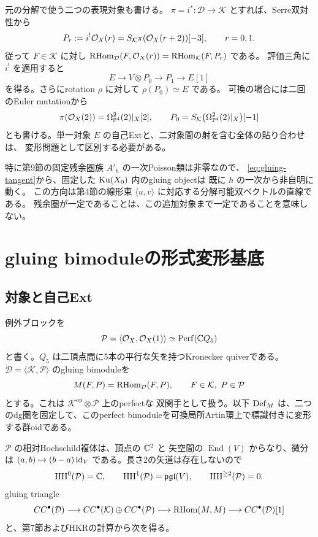 元の分解で使う二つの表現対象も書ける。
$\pi=i^*:\mathcal D\to\mathcal K$ とすれば、Serre双対性から
\[
 P_r:=i^!\mathcal O_X(r)=S_{\mathcal K}\pi(\mathcal O_X(r+2))[-3],
 \qquad r=0,1.
\]
従って $F\in\mathcal K$ に対し
$\operatorname{RHom}_{\mathcal D}(F,\mathcal O_X(r))=\operatorname{RHom}_{\mathcal K}(F,P_r)$ である。
評価三角に $i^!$ を適用すると
\[
 E\longrightarrow V\otimes P_0\longrightarrow P_1\longrightarrow E[1]
\]
を得る。さらにrotation $\rho$ に対して
$\rho(P_0)\simeq E$ である\cite[Remark 7.2]{FLZ}。
可換の場合には二回のEuler mutationから
\[
 \pi(\mathcal O_X(2))=\Omega^2_{\mathbb P^4}(2)|_X[2],\qquad
 P_0=S_{\mathcal K}\bigl(\Omega^2_{\mathbb P^4}(2)|_X\bigr)[-1]
\]
とも書ける。単一対象 $E$ の自己Extと、二対象間の射を含む全体の貼り合わせは、
変形問題として区別する必要がある。

特に第9節の固定残余圏族 $A'_h$ の一次Poisson類は非零なので、
\eqref{eq:gluing-tangent}から、固定した $\operatorname{Ku}(X_0)$ 内のgluing objectは
既に $h$ の一次から非自明に動く。
この方向は第4節の線形束 $\langle u,v\rangle$ に対応する分解可能双ベクトルの直線である。
残余圏が一定であることは、この追加対象まで一定であることを意味しない。

\section{gluing bimoduleの形式変形基底}\label{sec:gluing-moduli}

\subsection{対象と自己Ext}

例外ブロックを
\[
 \mathcal P=\langle\mathcal O_X,\mathcal O_X(1)\rangle
 \simeq\operatorname{Perf}(\mathbb C Q_5)
\]
と書く。$Q_5$ は二頂点間に5本の平行な矢を持つKronecker quiverである。
$\mathcal D=\langle\mathcal K,\mathcal P\rangle$ のgluing bimoduleを
\[
 M(F,P)=\operatorname{RHom}_{\mathcal D}(F,P),\qquad
 F\in\mathcal K,\ P\in\mathcal P
\]
とする。これは $\mathcal K^{\mathrm{op}}\otimes\mathcal P$ 上のperfectな
双関手として扱う。以下 $\operatorname{Def}_M$ は、二つのdg圏を固定して、このperfect
bimoduleを可換局所Artin環上で標識付きに変形する群oidである。

$\mathcal P$ の相対Hochschild複体は、頂点の $\mathbb C^2$ と
矢空間の $\operatorname{End}(V)$ からなり、微分は
$(a,b)\mapsto(b-a)\operatorname{id}_V$ である。長さ2の矢道は存在しないので
\[
 \operatorname{HH}^0(\mathcal P)=\mathbb C,\qquad
 \operatorname{HH}^1(\mathcal P)=\mathfrak{pgl}(V),\qquad
 \operatorname{HH}^{\ge2}(\mathcal P)=0.
\]
gluing triangle
\begin{equation}\label{eq:full-gluing-triangle}
 CC^\bullet(\mathcal D)\longrightarrow
 CC^\bullet(\mathcal K)\oplus CC^\bullet(\mathcal P)
 \longrightarrow\operatorname{RHom}(M,M)\longrightarrow CC^\bullet(\mathcal D)[1]
\end{equation}
と、第7節およびHKRの計算から次を得る。

